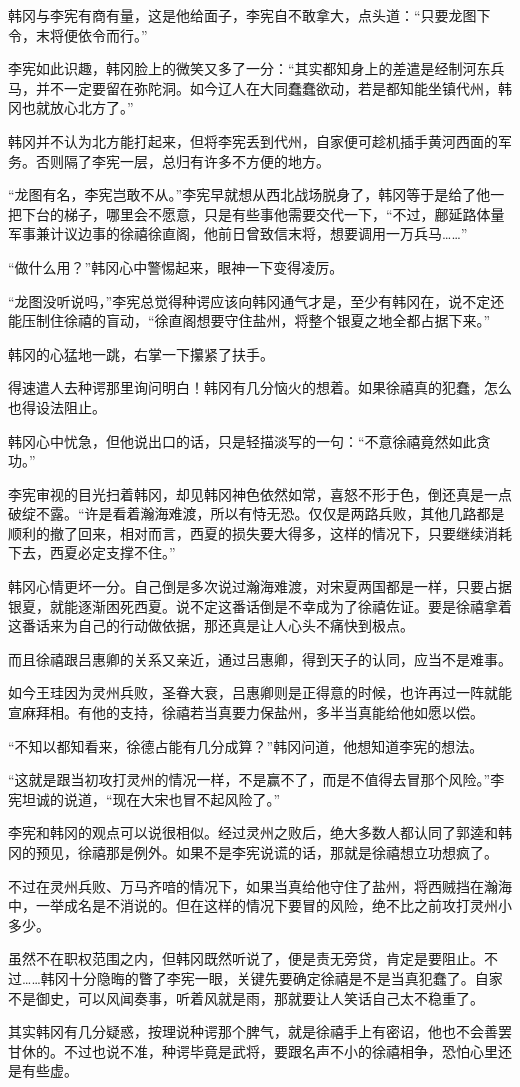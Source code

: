 韩冈与李宪有商有量，这是他给面子，李宪自不敢拿大，点头道：“只要龙图下令，末将便依令而行。”

李宪如此识趣，韩冈脸上的微笑又多了一分：“其实都知身上的差遣是经制河东兵马，并不一定要留在弥陀洞。如今辽人在大同蠢蠢欲动，若是都知能坐镇代州，韩冈也就放心北方了。”

韩冈并不认为北方能打起来，但将李宪丢到代州，自家便可趁机插手黄河西面的军务。否则隔了李宪一层，总归有许多不方便的地方。

“龙图有名，李宪岂敢不从。”李宪早就想从西北战场脱身了，韩冈等于是给了他一把下台的梯子，哪里会不愿意，只是有些事他需要交代一下，“不过，鄜延路体量军事兼计议边事的徐禧徐直阁，他前日曾致信末将，想要调用一万兵马……”

“做什么用？”韩冈心中警惕起来，眼神一下变得凌厉。

“龙图没听说吗，”李宪总觉得种谔应该向韩冈通气才是，至少有韩冈在，说不定还能压制住徐禧的盲动，“徐直阁想要守住盐州，将整个银夏之地全都占据下来。”

韩冈的心猛地一跳，右掌一下攥紧了扶手。

得速遣人去种谔那里询问明白！韩冈有几分恼火的想着。如果徐禧真的犯蠢，怎么也得设法阻止。

韩冈心中忧急，但他说出口的话，只是轻描淡写的一句：“不意徐禧竟然如此贪功。”

李宪审视的目光扫着韩冈，却见韩冈神色依然如常，喜怒不形于色，倒还真是一点破绽不露。“许是看着瀚海难渡，所以有恃无恐。仅仅是两路兵败，其他几路都是顺利的撤了回来，相对而言，西夏的损失要大得多，这样的情况下，只要继续消耗下去，西夏必定支撑不住。”

韩冈心情更坏一分。自己倒是多次说过瀚海难渡，对宋夏两国都是一样，只要占据银夏，就能逐渐困死西夏。说不定这番话倒是不幸成为了徐禧佐证。要是徐禧拿着这番话来为自己的行动做依据，那还真是让人心头不痛快到极点。

而且徐禧跟吕惠卿的关系又亲近，通过吕惠卿，得到天子的认同，应当不是难事。

如今王珪因为灵州兵败，圣眷大衰，吕惠卿则是正得意的时候，也许再过一阵就能宣麻拜相。有他的支持，徐禧若当真要力保盐州，多半当真能给他如愿以偿。

“不知以都知看来，徐德占能有几分成算？”韩冈问道，他想知道李宪的想法。

“这就是跟当初攻打灵州的情况一样，不是赢不了，而是不值得去冒那个风险。”李宪坦诚的说道，“现在大宋也冒不起风险了。”

李宪和韩冈的观点可以说很相似。经过灵州之败后，绝大多数人都认同了郭逵和韩冈的预见，徐禧那是例外。如果不是李宪说谎的话，那就是徐禧想立功想疯了。

不过在灵州兵败、万马齐喑的情况下，如果当真给他守住了盐州，将西贼挡在瀚海中，一举成名是不消说的。但在这样的情况下要冒的风险，绝不比之前攻打灵州小多少。

虽然不在职权范围之内，但韩冈既然听说了，便是责无旁贷，肯定是要阻止。不过……韩冈十分隐晦的瞥了李宪一眼，关键先要确定徐禧是不是当真犯蠢了。自家不是御史，可以风闻奏事，听着风就是雨，那就要让人笑话自己太不稳重了。

其实韩冈有几分疑惑，按理说种谔那个脾气，就是徐禧手上有密诏，他也不会善罢甘休的。不过也说不准，种谔毕竟是武将，要跟名声不小的徐禧相争，恐怕心里还是有些虚。

